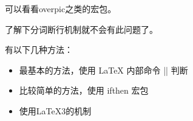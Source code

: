 
\begin{texlist}
\end{texlist}



可以看看overpic之类的宏包。



了解下分词断行机制就不会有此问题了。













有以下几种方法：
\begin{itemize}
\item 最基本的方法，使用 \LaTeX{} 内部命令 |\@ifstar| 判断
\begin{texlist}
    \makeatletter
    \newcommand{\mycommand}{%
      \@ifstar
        \mycommandStar%
        \mycommandNoStar%
    }
    \makeatother
    \newcommand{\mycommandStar}{starred version}
    \newcommand{\mycommandNoStar}{normal version}
\end{texlist}
\item 比较简单的方法，使用 ifthen 宏包
\begin{texlist}
    \usepackage{ifthen}
    \newcommand{\mycommand}[1]{\ifthenelse{\equal{#1}{*}}%
      {\mycommandStar}%
      {\mycommandNoStar{#1}}%
    }
    \newcommand{\mycommandStar}{starred version}
    \newcommand{\mycommandNoStar}[1]{normal version}  
\end{texlist}
\item 使用\LaTeX{3}的机制
\begin{texlist}
    \usepackage{xparse}
    \NewDocumentCommand{}
\end{texlist}
\end{itemize}



